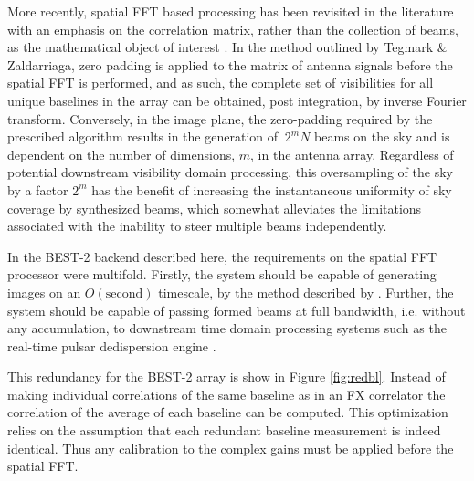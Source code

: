 \documentclass[useAMS,macros,usenatbib]{mn2e}
\begin{document}
More recently, spatial FFT based processing has been revisited in the literature with an emphasis on the correlation matrix, rather than the collection of beams, as the mathematical object of interest \citep{fftt} \citep{omniscope}.
In the method outlined by Tegmark \& Zaldarriaga, zero padding is applied to the matrix of antenna signals before the spatial FFT is performed, and as such, the complete set of visibilities for all unique baselines in the array can be obtained, post integration, by inverse Fourier transform.
Conversely, in the image plane, the zero-padding required by the prescribed algorithm results in the generation of $~2^{m}N$ beams on the sky and is dependent on the number of dimensions, $m$, in the antenna array.
Regardless of potential downstream visibility domain processing, this oversampling of the sky by a factor $2^{m}$ has the benefit of increasing the instantaneous uniformity of sky coverage by synthesized beams, which somewhat alleviates the limitations associated with the inability to steer multiple beams independently.

In the BEST-2 backend described here, the requirements on the spatial FFT processor were multifold.
Firstly, the system should be capable of generating images on an $O(\mathrm{second})$ timescale, by the method described by \citep{fftt}.
Further, the system should be capable of passing formed beams at full bandwidth, i.e. without any accumulation, to downstream time domain processing systems such as the real-time pulsar dedispersion engine \citep{dedispersion}. 

This redundancy for the BEST-2 array is show in Figure \ref{fig:redbl}.
Instead of making individual correlations of the same baseline as in an FX correlator the correlation of the average of each baseline can be computed.
This optimization relies on the assumption that each redundant baseline measurement is indeed identical.
Thus any calibration to the complex gains must be applied before the spatial FFT.
\end{document}
